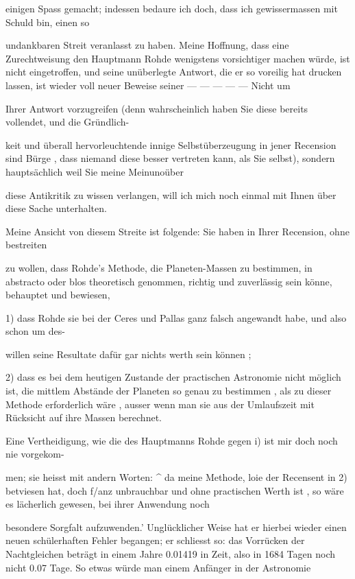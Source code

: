 \documentclass[10pt,a4paper]{article}
\begin{document}
einigen Spass gemacht; indessen bedaure ich doch, dass ich gewissermassen mit Schuld bin, einen so

undankbaren Streit veranlasst zu haben. Meine Hoffnung, dass eine Zurechtweisung den Hauptmann Rohde wenigstens vorsichtiger machen würde, ist nicht eingetroffen, und seine unüberlegte Antwort, die er so voreilig hat drucken lassen, ist wieder voll neuer Beweise seiner — — — — — Nicht um

Ihrer Antwort vorzugreifen (denn wahrscheinlich haben Sie diese bereits vollendet, und die Gründlich-

keit und überall hervorleuchtende innige Selbstüberzeugung in jener Recension sind Bürge , dass niemand diese besser vertreten kann, als Sie selbst), sondern hauptsächlich weil Sie meine Meinunoüber

diese Antikritik zu wissen verlangen, will ich mich noch einmal mit Ihnen über diese Sache unterhalten.

Meine Ansicht von diesem Streite ist folgende: Sie haben in Ihrer Recension, ohne bestreiten

zu wollen, dass Rohde's Methode, die Planeten-Massen zu bestimmen, in abstracto oder blos theoretisch genommen, richtig und zuverlässig sein könne, behauptet und bewiesen,

1) dass Rohde sie bei der Ceres und Pallas ganz falsch angewandt habe, und also schon um des-

willen seine Resultate dafür gar nichts werth sein können ;

2) dass es bei dem heutigen Zustande der practischen Astronomie nicht möglich ist, die mittlem Abstände der Planeten so genau zu bestimmen , als zu dieser Methode erforderlich wäre , ausser wenn man sie aus der Umlaufszeit mit Rücksicht auf ihre Massen berechnet.

Eine Vertheidigung, wie die des Hauptmanns Rohde gegen i) ist mir doch noch nie vorgekom-

men; sie heisst mit andern Worten: \textasciicircum{} da meine Methode, loie der Recensent in 2) betviesen hat, doch f/anz unbrauchbar und ohne practischen Werth ist , so wäre es lächerlich gewesen, bei ihrer Anwendung noch

besondere Sorgfalt aufzuwenden.' Unglücklicher Weise hat er hierbei wieder einen neuen schülerhaften Fehler begangen; er schliesst so: das Vorrücken der Nachtgleichen beträgt in einem Jahre 0.01419 in Zeit, also in 1684 Tagen noch nicht 0.07 Tage. So etwas würde man einem Anfänger in der Astronomie
\end{document}
